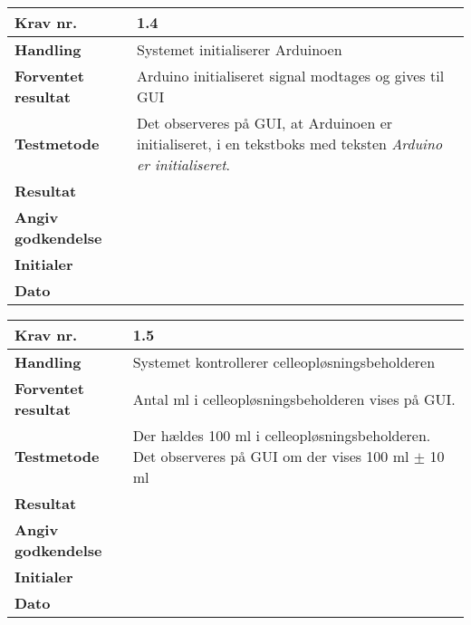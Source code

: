 	\begin{center}
		\begin{longtable}{ | m{4cm}| m{8.5cm}|} 
			\hline
			\textbf{Krav nr.} & 1.4    \\ 
			\hline
			\textbf{Handling} &  Systemet initialiserer Arduinoen   \\
			\hline
			\textbf{Forventet resultat} &  Arduino initialiseret signal modtages og gives til GUI  \\
			\hline
			\textbf{Testmetode}  & Det observeres på GUI, at Arduinoen er initialiseret, i en tekstboks med teksten \textit{Arduino er initialiseret}.   \\
			\hline
			\textbf{Resultat}  &    \\
			\hline
			\textbf{Angiv godkendelse} &     \\
			\hline
			\textbf{Initialer} &     \\
			\hline
			\textbf{Dato} &    \\
			\hline
		\end{longtable}
	\end{center}
	
	\begin{center}
		\begin{longtable}{ | m{4cm}| m{8.5cm}|} 
			\hline
			\textbf{Krav nr.} & 1.5    \\ 
			\hline
			\textbf{Handling} &  Systemet kontrollerer celleopløsningsbeholderen  \\
			\hline
			\textbf{Forventet resultat} &  Antal ml i celleopløsningsbeholderen vises på GUI.  \\
			\hline
			\textbf{Testmetode}  & Der hældes 100 ml i celleopløsningsbeholderen. Det observeres på GUI om der vises 100 ml $\pm$ 10 ml   \\
			\hline			
			\textbf{Resultat}  &    \\
			\hline
			\textbf{Angiv godkendelse} &     \\
			\hline
			\textbf{Initialer} &     \\
			\hline
			\textbf{Dato} &    \\
			\hline
		\end{longtable}
	\end{center}	
	
